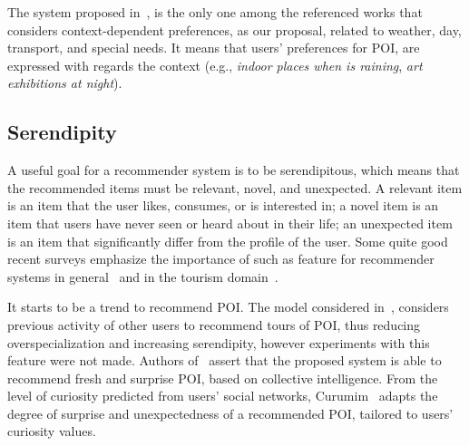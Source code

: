 

The system proposed in~\cite{alonso2012ontology}, is the only one among the referenced works that considers context-dependent   preferences, as our proposal,  related to weather, day, transport, and special needs. It means that users' preferences for POI, are expressed with regards the context (e.g., {\it indoor places when is raining}, {\it art exhibitions at night}).






\subsection{Serendipity}

A useful goal for a recommender system is to be serendipitous, which 
means that the recommended items must be relevant, novel, and unexpected. A relevant item is an item that the user likes, consumes, or is interested in; a novel item is an item that users have never seen or heard about in their life; an unexpected item is an item that significantly differ from the profile of the user. Some quite good recent surveys emphasize the importance of such as feature for recommender systems in general~\cite{kotkov2016survey,chen2019serendipity} and in the tourism domain~\cite{tintarev2010off,menk2019recommendation}.


It starts to be a trend to recommend  POI. The model considered in~\cite{rajaonarivo2019rec}, considers previous activity of other users to recommend tours of POI, thus reducing overspecialization and increasing serendipity, however experiments with this feature were not made. Authors of~\cite{shen2016attraction} assert that the proposed system is able to recommend fresh and surprise POI, based on collective intelligence.
 From the level of curiosity predicted from users' social networks, Curumim~\cite{menk2017curumim}  adapts the degree of surprise and unexpectedness of a recommended POI, tailored to users' curiosity values. 






